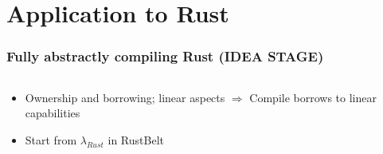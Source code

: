 \documentclass{beamer}
\begin{document}
\section{Application to Rust }

\begin{frame}
\frametitle{Fully abstractly compiling Rust (IDEA STAGE)}

\begin{columns}
\begin{column}{0.65\textwidth}
\begin{itemize}
\item Ownership and borrowing; linear aspects
\quad $\Rightarrow$ Compile borrows to linear capabilities
\item Start from $\lambda_{Rust}$ in RustBelt
\end{itemize}
\end{column}
\begin{column}{0.37\textwidth}
\def\firstcircle{(0,0) circle (2cm)}
\def\secondcircle{(0,0) circle (1.3cm)}

\end{column}
\end{columns}
\end{frame}
\end{document}
